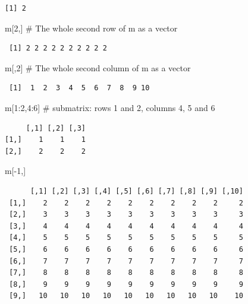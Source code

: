 \documentclass[
  letterpaper,
  DIV=11,
  numbers=noendperiod]{scrartcl}
\newenvironment{Shaded}{\begin{snugshade}}{\end{snugshade}}
\newcommand{\CommentTok}[1]{\textcolor[rgb]{0.37,0.37,0.37}{#1}}
\newcommand{\DecValTok}[1]{\textcolor[rgb]{0.68,0.00,0.00}{#1}}
\newcommand{\NormalTok}[1]{\textcolor[rgb]{0.00,0.23,0.31}{#1}}
\newcommand{\SpecialCharTok}[1]{\textcolor[rgb]{0.37,0.37,0.37}{#1}}
\begin{document}
\begin{verbatim}
[1] 2
\end{verbatim}

\begin{Shaded}
\begin{Highlighting}[]
\NormalTok{m[}\DecValTok{2}\NormalTok{,]   }\CommentTok{\# The whole second row of m as a vector}
\end{Highlighting}
\end{Shaded}

\begin{verbatim}
 [1] 2 2 2 2 2 2 2 2 2 2
\end{verbatim}

\begin{Shaded}
\begin{Highlighting}[]
\NormalTok{m[,}\DecValTok{2}\NormalTok{]   }\CommentTok{\# The whole second column of m as a vector}
\end{Highlighting}
\end{Shaded}

\begin{verbatim}
 [1]  1  2  3  4  5  6  7  8  9 10
\end{verbatim}

\begin{Shaded}
\begin{Highlighting}[]
\NormalTok{m[}\DecValTok{1}\SpecialCharTok{:}\DecValTok{2}\NormalTok{,}\DecValTok{4}\SpecialCharTok{:}\DecValTok{6}\NormalTok{] }\CommentTok{\# submatrix: rows 1 and 2, columns 4, 5 and 6}
\end{Highlighting}
\end{Shaded}

\begin{verbatim}
     [,1] [,2] [,3]
[1,]    1    1    1
[2,]    2    2    2
\end{verbatim}

\begin{Shaded}
\begin{Highlighting}[]
\NormalTok{m[}\SpecialCharTok{{-}}\DecValTok{1}\NormalTok{,]  }
\end{Highlighting}
\end{Shaded}

\begin{verbatim}
      [,1] [,2] [,3] [,4] [,5] [,6] [,7] [,8] [,9] [,10]
 [1,]    2    2    2    2    2    2    2    2    2     2
 [2,]    3    3    3    3    3    3    3    3    3     3
 [3,]    4    4    4    4    4    4    4    4    4     4
 [4,]    5    5    5    5    5    5    5    5    5     5
 [5,]    6    6    6    6    6    6    6    6    6     6
 [6,]    7    7    7    7    7    7    7    7    7     7
 [7,]    8    8    8    8    8    8    8    8    8     8
 [8,]    9    9    9    9    9    9    9    9    9     9
 [9,]   10   10   10   10   10   10   10   10   10    10
\end{verbatim}
\end{document}
